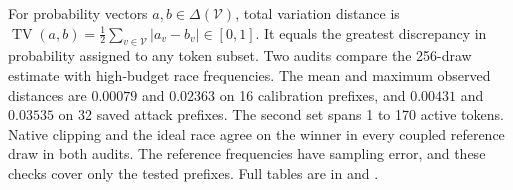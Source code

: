 For probability vectors $a,b\in\Delta(\mathcal V)$, total variation distance is
$\operatorname{TV}(a,b)=\tfrac12\sum_{v\in\mathcal V}|a_v-b_v|\in[0,1]$.
It equals the greatest discrepancy in probability assigned to any token subset. Two audits compare the 256-draw estimate with high-budget race frequencies. The mean and maximum observed distances are $0.00079$ and $0.02363$ on 16 calibration prefixes, and $0.00431$ and $0.03535$ on 32 saved attack prefixes. The second set spans 1 to 170 active tokens. Native clipping and the ideal race agree on the winner in every coupled reference draw in both audits. The reference frequencies have sampling error, and these checks cover only the tested prefixes. Full tables are in  and .
